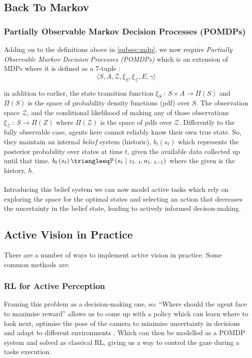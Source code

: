   \subsection{Back To Markov}
  \subsubsection{Partially Observable Markov Decision 
  \label{subsec:pomdp}
  Processes (POMDPs)}
  Adding on to the definitions above in \ref{subsec:mdp}, we now require \emph{Partially Observable Markov Decision Processes (POMDPs)} 
  which is an extension of MDPs where it is defined as a 7-tuple \cite{thrun2002probabilistic,placed2023surveyactivesimultaneouslocalization}: 
  \[\langle S, A, \mathcal{Z}, \xi_S, \xi_{\mathcal{Z}}, E, \gamma \rangle \]
  
  in addition to earlier, the state transition function \( \xi_S ~\colon~ S \times A \rightarrow \Pi\left(S\right)\) and $\Pi\left(S\right)$ is the space of probability density functions (pdf) over $S$. The observation space $\mathcal{Z}$, and the conditional likelihood of making any of those observations \(\xi_{\mathcal{Z}} ~\colon~ S \rightarrow \Pi\left(Z\right)\) where $\Pi\left(\mathcal{Z}\right)$ is the space of pdfs over $\mathcal{Z}$.
  Differently to the fully observable case, agents here cannot reliably know their own true state. So, they maintain an internal \emph{belief} system (historic), $b_t\left(s_t\right)$ which represents the posterior probability over states at time $t$, given the available data collected up until that time. \(b_t\left(s_t\right) \triangleeq  \mathbb{P}\left(s_t \mid z_{1 \colon t}, a_{1 \colon t - 1}\right)\) where the given is the history, $h$.
  \\\\
  Introducing this belief system we can now model active tasks which rely on exploring the space for the optimal states and selecting an action that decreases the uncertainty in the belief state, leading to actively informed decison-making.

  \subsection{Active Vision in Practice}
  There are a number of ways to implement active vision in practice. Some common methods are:

  \subsubsection{RL for Active Perception}
    Framing this problem as a decision-making one, so: ``Where should the agent face to maximise reward'' allows us to come up with a policy which can learn where to look next, optimise the pose of the camera to minimise uncertainty in decisions and adapt to different environments \cite{rothbucher2011,zhangembodied}. Which can then be modelled as a POMDP system and solved as classical RL, giving us a way to control the gaze during a tasks execution.

